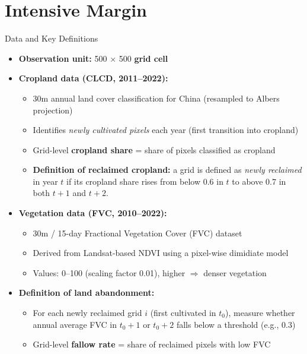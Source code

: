 \documentclass[10pt, xcolor=x11names,compress, aspectratio=169]{beamer}
\begin{document}
\section*{Intensive Margin}

\begin{frame}{Data and Key Definitions}
\begin{itemize}
    \item \textbf{Observation unit:} 500 $\times$ 500 \textbf{grid cell}

    \vspace{0.8em}
    \item \textbf{Cropland data (CLCD, 2011–2022):}
    \begin{itemize}
        \item 30m annual land cover classification for China (resampled to Albers projection)
        \item Identifies \emph{newly cultivated pixels} each year (first transition into cropland)
        \item Grid-level \textbf{cropland share} = share of pixels classified as cropland
        \item \textbf{Definition of reclaimed cropland:} a grid is defined as \textit{newly reclaimed} in year $t$
              if its cropland share rises from below 0.6 in $t$ to above 0.7 in both $t\!+\!1$ and $t\!+\!2$.
    \end{itemize}

    \vspace{0.8em}
    \item \textbf{Vegetation data (FVC, 2010–2022):}
    \begin{itemize}
        \item 30m / 15-day Fractional Vegetation Cover (FVC) dataset 
        \item Derived from Landsat-based NDVI using a pixel-wise dimidiate model
        \item Values: 0–100 (scaling factor 0.01), higher $\Rightarrow$ denser vegetation
    \end{itemize}

    \vspace{0.8em}
    \item \textbf{Definition of land abandonment:}
    \begin{itemize}
        \item For each newly reclaimed grid $i$ (first cultivated in $t_0$), 
              measure whether annual average FVC in $t_0\!+\!1$ or $t_0\!+\!2$ falls below a threshold (e.g., 0.3)
        \item Grid-level \textbf{fallow rate} = share of reclaimed pixels with low FVC
    \end{itemize}
\end{itemize}
\end{frame}
\end{document}
